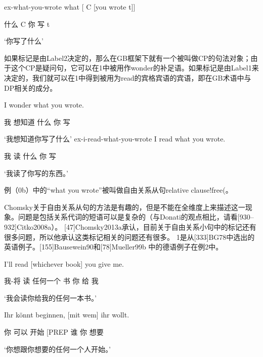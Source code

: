 ex-what-you-wrote
what [ C [you wrote t]]

什么 C 你 写 t

`你写了什么'

如果标记是由Label2决定的，那么在GB框架下就有一个被叫做CP的句法对象；由于这个CP是疑问句，它可以在1中被用作wonder的补足语。如果标记是由Label1来决定的，我们就可以在1中得到被用为read的宾格宾语的宾语，即在GB术语中与DP相关的成分。







I wonder what you wrote.

我 想知道 什么 你 写

`我想知道你写了什么'
ex-i-read-what-you-wrote 
I read what you wrote.

我 读 什么 你 写

`我读了你写的东西。'

例（0b）中的“what you wrote”被叫做自由关系从句relative clause!free(。


























Chomsky关于自由关系从句的方法是有趣的，但是不能在全维度上来描述这一现象。问题是包括关系代词的短语可以是复杂的（与Donati的观点相比，请看[930--932]Citko2008a）。 
[47]Chomsky2013a承认，目前关于自由关系小句中的标记还有很多问题，所以他承认这类标记相关的问题还有很多。
 1是从[333]BG78中选出的英语例子。[155]Bausewein90和[78]Mueller99b 中的德语例子在例2中。









I'll read [whichever book] you give me.

我-将 读 任何一个 书 你 给 我

`我会读你给我的任何一本书。'




 
Ihr könnt beginnen, [mit  wem] ihr wollt.

     你 可以    开始    [PREP 谁 你 想要

`你想跟你想要的任何一个人开始。'



